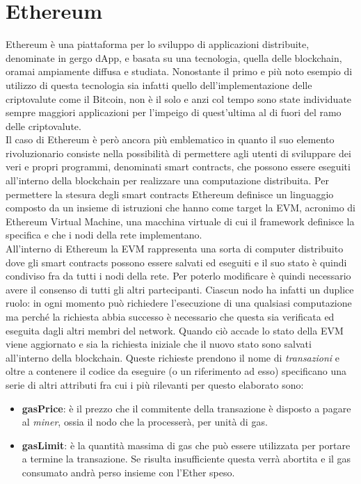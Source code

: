 \documentclass[12pt,a4paper,openright,oneside]{report}
\theoremstyle{definition}
\begin{document}
\section{Ethereum}\label{bg:ethereum}
Ethereum \cite{ethereum_website} \`{e} una piattaforma per lo sviluppo di applicazioni distribuite, denominate in gergo dApp, e basata su una tecnologia, quella delle blockchain, oramai ampiamente diffusa e studiata. Nonostante il primo e pi\`{u} noto esempio di utilizzo di questa tecnologia sia infatti quello dell'implementazione delle criptovalute come il Bitcoin, non \`{e} il solo e anzi col tempo sono state individuate sempre maggiori applicazioni per l'impeigo di quest'ultima al di fuori del ramo delle criptovalute.\\ Il caso di Ethereum \`{e} per\`{o} ancora pi\`{u} emblematico in quanto il suo elemento rivoluzionario consiste nella possibilit\`{a} di permettere agli utenti di sviluppare dei veri e propri programmi, denominati smart contracts, che possono essere eseguiti all'interno della blockchain per realizzare una computazione distribuita.
Per permettere la stesura degli smart contracts Ethereum definisce un linguaggio composto da un insieme di istruzioni che hanno come target la EVM, acronimo di Ethereum Virtual Machine, una macchina virtuale di cui il framework definisce la specifica e che i nodi della rete implementano.\\
All'interno di Ethereum la EVM rappresenta una sorta di computer distribuito dove gli smart contracts possono essere salvati ed eseguiti e il suo stato \`{e} quindi condiviso fra da tutti i nodi della rete. Per poterlo modificare \`{e} quindi necessario avere il consenso di tutti gli altri partecipanti. Ciascun nodo ha infatti un duplice ruolo: in ogni momento pu\`{o} richiedere l'esecuzione di una qualsiasi computazione ma perch\'{e} la richiesta abbia successo \`{e} necessario che questa sia verificata ed eseguita dagli altri membri del network. Quando ci\`{o} accade lo stato della EVM viene aggiornato e sia la richiesta iniziale che il nuovo stato sono salvati all'interno della blockchain. Queste richieste prendono il nome di \textit{transazioni} e oltre a contenere il codice da eseguire (o un riferimento ad esso) specificano una serie di altri attributi fra cui i pi\`{u} rilevanti per questo elaborato sono:
\begin{itemize}
    \item \textbf{gasPrice}: \`{e} il prezzo che il commitente della transazione \`{e} disposto a pagare al \textit{miner}, ossia il nodo che la processer\`{a}, per unit\`{a} di gas.
    \item \textbf{gasLimit}: \`{e} la quantit\`{a} massima di gas che pu\`{o} essere utilizzata per portare a termine la transazione. Se risulta insufficiente questa verr\`{a} abortita e il gas consumato andr\`{a} perso insieme con l'Ether speso.
\end{itemize}
\end{document}
